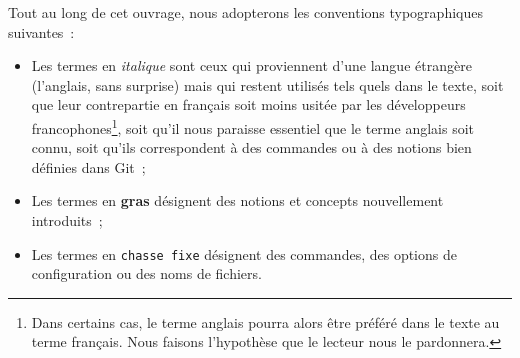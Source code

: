 Tout au long de cet ouvrage, nous adopterons les conventions
typographiques suivantes~:
\begin{itemize}
\item Les termes en \textit{italique} sont ceux qui proviennent d'une
  langue étrangère (l'anglais, sans surprise) mais qui restent
  utilisés tels quels dans le texte, soit que leur contrepartie en
  français soit moins usitée par les développeurs
  francophones\footnote{Dans certains cas, le terme anglais pourra
    alors être préféré dans le texte au terme français. Nous faisons
    l'hypothèse que le lecteur nous le pardonnera.}, soit qu'il nous
  paraisse essentiel que le terme anglais soit connu, soit qu'ils
  correspondent à des commandes ou à des notions bien définies dans
  Git~;
\item Les termes en \textbf{gras} désignent des notions et concepts
  nouvellement introduits~;
\item Les termes en \texttt{chasse fixe} désignent des commandes, des
  options de configuration ou des noms de fichiers.
\end{itemize}